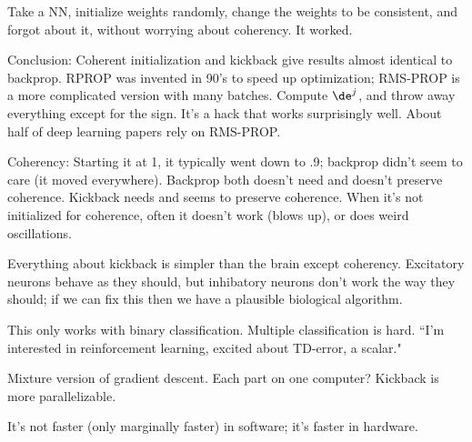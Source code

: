 Take a NN, initialize weights randomly, change the weights to be consistent, and forgot about it, without worrying about coherency. It worked.

Conclusion: Coherent initialization and kickback give results almost identical to backprop. %
RPROP was invented in 90's to speed up optimization; RMS-PROP  is a more complicated version with many batches. Compute $\de^j$, and throw away everything except for the sign. It's a hack that works surprisingly well. About half of deep learning papers rely on RMS-PROP.

Coherency: Starting it at 1, it typically went down to .9; backprop didn't seem to care (it moved everywhere). Backprop both doesn't need and doesn't preserve coherence. Kickback needs and seems to preserve coherence. 
When it's not initialized for coherence, often it doesn't work (blows up), or does weird oscillations. 

Everything about kickback is simpler than the brain except coherency. Excitatory neurons behave as they should, but inhibatory neurons don't work the way they should; if we can fix this then we have a plausible biological algorithm.



This only works with binary classification. Multiple classification is hard. ``I'm interested in reinforcement learning, excited about 
TD-error, a scalar."

Mixture version of gradient descent. Each part on one computer?
Kickback is more parallelizable.

It's not faster (only marginally faster) in software; it's faster in hardware.





%
 
%
%

